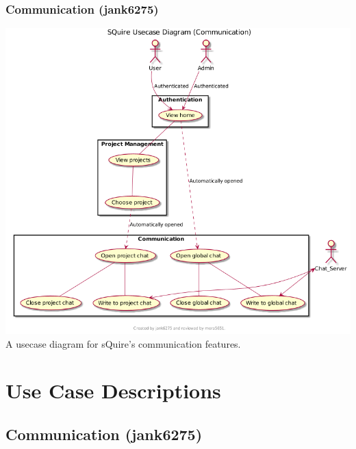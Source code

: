 \documentclass[11pt]{report}
\begin{document}
    \subsection{Communication (jank6275)}
        \includegraphics[width=\textwidth]{diagrams/usecase-communication}
        A usecase diagram for sQuire's communication features.



\chapter{Use Case Descriptions}

\section{Communication (jank6275)}
\end{document}
